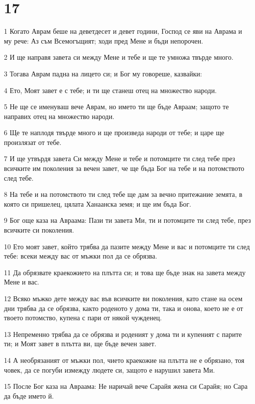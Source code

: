\chapter{17}

\par 1 Когато Аврам беше на деветдесет и девет години, Господ се яви на Аврама и му рече: Аз съм Всемогъщият; ходи пред Мене и бъди непорочен.
\par 2 И ще направя завета си между Мене и тебе и ще те умножа твърде много.
\par 3 Тогава Аврам падна на лицето си; и Бог му говореше, казвайки:
\par 4 Ето, Моят завет е с тебе; и ти ще станеш отец на множество народи.
\par 5 Не ще се именуваш вече Аврам, но името ти ще бъде Авраам; защото те направих отец на множество народи.
\par 6 Ще те наплодя твърде много и ще произведа народи от тебе; и царе ще произлязат от тебе.
\par 7 И ще утвърдя завета Си между Мене и тебе и потомците ти след тебе през всичките им поколения за вечен завет, че ще бъда Бог на тебе и на потомството след тебе.
\par 8 На тебе и на потомството ти след тебе ще дам за вечно притежание земята, в която си пришелец, цялата Ханаанска земя; и ще им бъда Бог.
\par 9 Бог още каза на Авраама: Пази ти завета Ми, ти и потомците ти след тебе, през всичките си поколения.
\par 10 Ето моят завет, който трябва да пазите между Мене и вас и потомците ти след тебе: всеки между вас от мъжки пол да се обрязва.
\par 11 Да обрязвате краекожието на плътта си; и това ще бъде знак на завета между Мене и вас.
\par 12 Всяко мъжко дете между вас във всичките ви поколения, като стане на осем дни трябва да се обрязва, както роденото у дома ти, така и онова, което не е от твоето потомство, купена с пари от някой чужденец.
\par 13 Непременно трябва да се обрязва и роденият у дома ти и купеният с парите ти; и Моят завет в плътта ви, ще бъде вечен завет.
\par 14 А необрязаният от мъжки пол, чието краекожие на плътта не е обрязано, тоя човек, да се погуби измежду людете си, защото е нарушил завета Ми.
\par 15 После Бог каза на Авраама: Не наричай вече Сарайя жена си Сарайя; но Сара да бъде името й.
